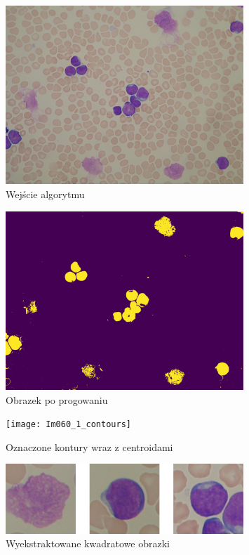 \begin{figure}
    \centering
    \includegraphics[width=0.8\textwidth]{Im060_1}
    \caption{Wejście algorytmu}
    \label{fig:extract_input}
\end{figure}

\begin{figure}
    \centering
    \includegraphics[width=0.8\textwidth]{Im060_1_thresh}
    \caption{Obrazek po progowaniu}
    \label{fig:extract_thresh}
\end{figure}

\begin{figure}
    \centering
    \texttt{[image: Im060\_1\_contours]}
    \caption{Oznaczone kontury wraz z centroidami}
    \label{fig:extract_contours}
\end{figure}

\begin{figure}
    \centering
    \includegraphics[width=0.8\textwidth]{cells}
    \caption{Wyekstraktowane kwadratowe obrazki}
    \label{fig:extract_squares}
\end{figure}

